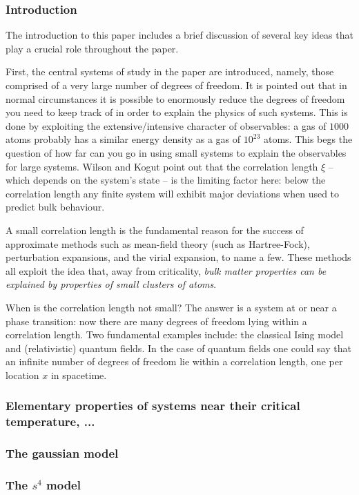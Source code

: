 \documentclass[11pt]{amsart}
\theoremstyle{plain}%
\theoremstyle{definition}
\theoremstyle{remark}
\begin{document}
\subsubsection{Introduction}
The introduction to this paper includes a brief discussion of several key ideas that play a crucial role throughout the paper. 

First, the central systems of study in the paper are introduced, namely, those comprised of a very large number of degrees of freedom. It is pointed out that in normal circumstances it is possible to enormously reduce the degrees of freedom you need to keep track of in order to explain the physics of such systems. This is done by exploiting the extensive/intensive character of observables: a gas of $1000$ atoms probably has a similar energy density as a gas of $10^{23}$ atoms. This begs the question of how far can you go in using small systems to explain the observables for large systems. Wilson and Kogut point out that the correlation length $\xi$ -- which depends on the system's state -- is the limiting factor here: below the correlation length any finite system will exhibit major deviations when used to predict bulk behaviour.

A small correlation length is the fundamental reason for the success of approximate methods such as mean-field theory (such as Hartree-Fock), perturbation expansions, and the virial expansion, to name a few. These methods all exploit the idea that, away from criticality, \emph{bulk matter properties can be explained by properties of small clusters of atoms}. 

When is the correlation length not small? The answer is a system at or near a phase transition: now there are many degrees of freedom lying within a correlation length. Two fundamental examples include: the classical Ising model and (relativistic) quantum fields. In the case of quantum fields one could say that an infinite number of degrees of freedom lie within a correlation length, one per location $x$ in spacetime.


\subsubsection{Elementary properties of systems near their critical temperature, ...}
\subsubsection{The gaussian model}
\subsubsection{The $s^4$ model}
\end{document}
